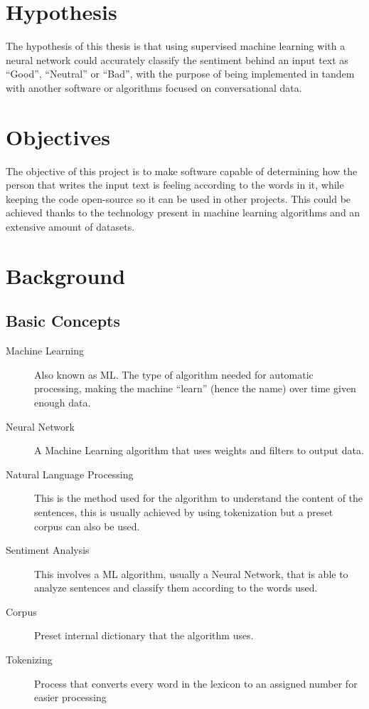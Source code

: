 \documentclass[a4]{sciposter}
\begin{document}
\begin{multicols}{3}
\section{Hypothesis}
The hypothesis of this thesis is that using supervised machine learning with a neural network could accurately classify the sentiment behind an input text as ``Good'', ``Neutral'' or ``Bad'', with the purpose of being implemented in tandem with another software or algorithms focused on conversational data.

\section{Objectives}
The objective of this project is to make software capable of determining how the person that writes the input text is feeling according to the words in it, while keeping the code open-source so it can be used in other projects. This could be achieved thanks to the technology present in machine learning algorithms and an extensive amount of datasets.

\section{Background}
\subsection{Basic Concepts}
\begin{description}
	\item[Machine Learning]{Also known as ML. The type of algorithm needed for automatic processing, making the machine ``learn'' (hence the name) over time given enough data.}
	\item[Neural Network]{A Machine Learning algorithm that uses weights and filters to output data.}
	\item[Natural Language Processing]{This is the method used for the algorithm to understand the content of the sentences, this is usually achieved by using tokenization but a preset corpus can also be used.}	
	\item[Sentiment Analysis]{This involves a ML algorithm, usually a Neural Network, that is able to analyze sentences and classify them according to the words used.}
	\item[Corpus]{Preset internal dictionary that the algorithm uses.}
	\item[Tokenizing]{Process that converts every word in the lexicon to an assigned number for easier processing}
\end{description}


\end{multicols}
\end{document}
